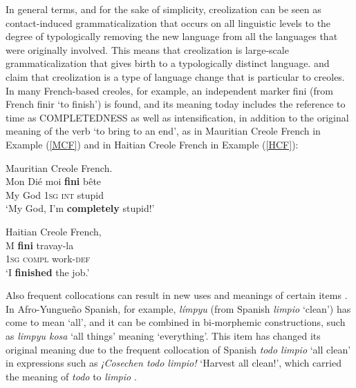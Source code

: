 \documentclass[output=paper,
modfonts
]{langscibook}
\begin{document}
In general terms, and for the sake of simplicity, creolization can be seen as contact-induced grammaticalization that occurs on all linguistic levels to the degree of typologically removing the new language from all the languages that were originally involved. This means that creolization is large-scale grammaticalization that gives birth to a typologically distinct language. \cite{detges2000two} and \cite{bruyn2008grammaticalization} claim that creolization is a type of language change that is particular to creoles. In many French-based creoles, for example, an independent marker fini (from French finir ‘to finish’) is found, and its meaning today includes the reference to time as COMPLETEDNESS as well as intensification, in addition to the original meaning of the verb ‘to bring to an end’, as in Mauritian Creole French in Example (\ref{MCF}) and in Haitian Creole French in Example (\ref{HCF}):

\ea \textnormal{Mauritian Creole French. \citep[139]{detges2000two}}\\
\label{MCF}
\gll Mon Dié moi \textbf{fini} bête\\ 
My God \textsc{1sg} \textsc{int} stupid\\
\glt ‘My God, I’m \textbf{completely} stupid!’ 
\z

\ea \textnormal{Haitian Creole French, \citep[140]{detges2000two}}\\
\label{HCF}
\gll M \textbf{fini} travay-la\\ 
\textsc{1sg} \textsc{compl} work-\textsc{def}\\
\glt ‘I \textbf{finished} the job.’
\z

Also frequent collocations can result in new uses and meanings of certain items \citep{detges2000two}. In Afro-Yungueño Spanish, for example, \emph{límpyu} (from Spanish \emph{limpio} ‘clean’) has come to mean ‘all’, and it can be combined in bi-morphemic constructions, such as \emph{limpyu kosa} ‘all things’ meaning ‘everything’. This item has changed its original meaning due to the frequent collocation of Spanish \emph{todo limpio} ‘all clean’ in expressions such as \emph{¡Cosechen todo limpio!} ‘Harvest all clean!’, which carried the meaning of \emph{todo} to \emph{limpio} \citep[322]{perez2015traces}.
\end{document}
